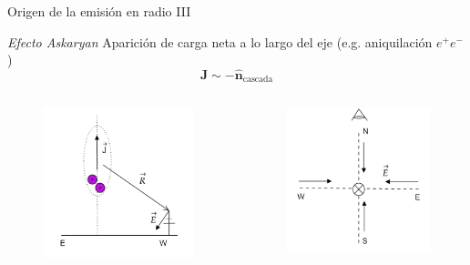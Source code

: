 \documentclass{beamer}
\newcommand{\vect}[1]{\boldsymbol{\mathbf{#1}}}
\begin{document}
\setcounter{page}{14}
\begin{frame}{Origen de la emisión en radio III}
	
	\begin{block}{\centering\textit{Efecto Askaryan}}
			\centering Aparición de carga neta a lo largo del eje (e.g. aniquilación $e^+e^-$)
			$$\vect{J}\sim-\hat{\vect{n}}_{\text{cascada}}$$
		\end{block}
	
	\begin{columns}
		
		\begin{figure}[H]
			\centering
			\includegraphics[width=.6\linewidth]{figures/Askaryan_1}
		\end{figure}
		\begin{figure}[H]
			\centering
			\includegraphics[width=.6\linewidth]{figures/Askaryan_2}
		\end{figure}
	\end{columns}
\end{frame}
\end{document}
